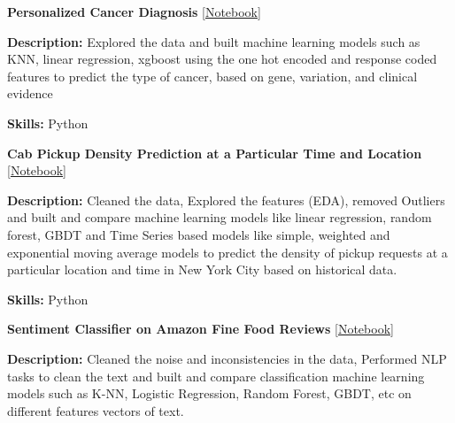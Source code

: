 \documentclass[letterpaper,MMMyyyy,nonstopmode]{simpleresumecv}
\begin{document}
\begin{Body}
                \BigGap


                \Entry
                \textbf{Personalized Cancer Diagnosis}
                [\href{http://bit.ly/PredictCancer}{Notebook}]

                \Gap

                \Item
                    \textbf{Description:}
                    Explored the data and built machine learning models such as 
                    KNN, linear regression, xgboost using the one hot encoded 
                    and response coded features to predict the type of cancer, 
                    based on gene, variation, and clinical evidence
                
                \Gap

                \Item
                    \textbf{Skills:}
                    Python
                

                \BigGap

            
                \Entry
                    \textbf{Cab Pickup Density Prediction at a Particular Time and Location}
                    [\href{http://bit.ly/PickupDensity}{Notebook}]

                    \Gap

                    \Item
                        \textbf{Description:}
                        Cleaned the data, Explored the features (EDA), 
                        removed Outliers and built and compare machine learning models 
                        like  linear regression, random forest, GBDT and Time Series 
                        based models like simple, weighted and exponential moving average 
                        models to predict the density of pickup requests at a 
                        particular location and time in New York City based on historical data.
                    
                    \Gap

                    \Item
                        \textbf{Skills:}
                        Python
                
                
                \BigGap
                

                \Entry
                    \textbf{Sentiment Classifier on Amazon Fine Food Reviews}
                    [\href{http://bit.ly/AmznSentimentClassifier}{Notebook}]

                    \Gap

                    \Item
                        \textbf{Description:}
                        Cleaned the noise and inconsistencies in the data, 
                        Performed NLP tasks to clean the text and built and 
                        compare classification machine learning models such as 
                        K-NN, Logistic Regression, Random Forest, GBDT, etc 
                        on different features vectors of text.
                    

\end{Body}
\end{document}
